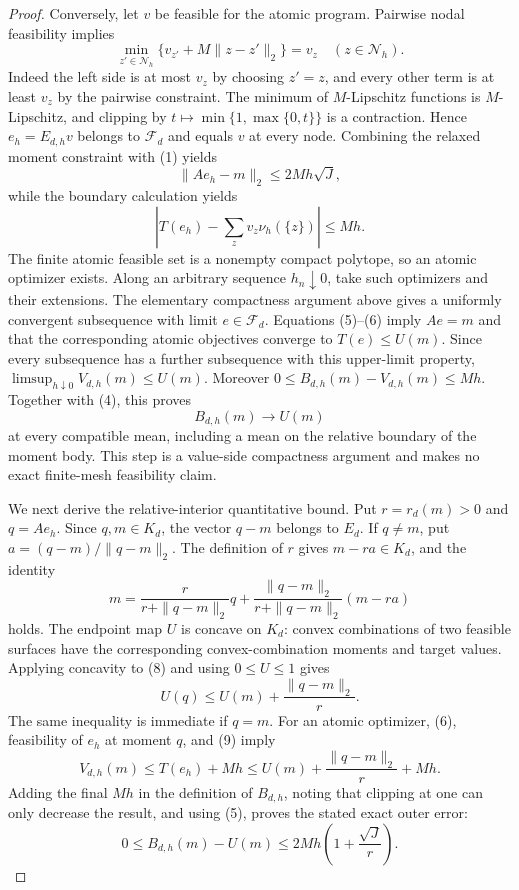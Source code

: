 \documentclass{article}
\begin{document}
\begin{proof}
Conversely, let \(v\) be feasible for the atomic program.  Pairwise nodal
feasibility implies
\[
 \min_{z'\in\mathcal N_h}\{v_{z'}+M\|z-z'\|_2\}=v_z
 \quad(z\in\mathcal N_h).
\]
Indeed the left side is at most \(v_z\) by choosing \(z'=z\), and every other
term is at least \(v_z\) by the pairwise constraint.  The minimum of
\(M\)-Lipschitz functions is \(M\)-Lipschitz, and clipping by
\(t\mapsto\min\{1,\max\{0,t\}\}\) is a contraction.  Hence
\(e_h=E_{d,h}v\) belongs to \(\mathcal F_d\) and equals \(v\) at every node.
Combining the relaxed moment constraint with (1) yields
\[
 \|Ae_h-m\|_2\le 2Mh\sqrt J,                                 \tag{5}
\]
while the boundary calculation yields
\[
 \left|T(e_h)-\sum_zv_z\nu_h(\{z\})\right|\le Mh.            \tag{6}
\]
The finite atomic feasible set is a nonempty compact polytope, so an atomic
optimizer exists.  Along an arbitrary sequence \(h_n\downarrow0\), take such
optimizers and their extensions.  The elementary compactness argument above
gives a uniformly convergent subsequence with limit \(e\in\mathcal F_d\).
Equations (5)--(6) imply \(Ae=m\) and that the corresponding atomic objectives
converge to \(T(e)\le U(m)\).  Since every subsequence has a further subsequence
with this upper-limit property,
\(\limsup_{h\downarrow0}V_{d,h}(m)\le U(m)\).  Moreover
\(0\le B_{d,h}(m)-V_{d,h}(m)\le Mh\).  Together with (4), this proves
\[
 B_{d,h}(m)\longrightarrow U(m)                              \tag{7}
\]
at every compatible mean, including a mean on the relative boundary of the
moment body.  This step is a value-side compactness argument and makes no exact
finite-mesh feasibility claim.

We next derive the relative-interior quantitative bound.  Put
\(r=r_d(m)>0\) and \(q=Ae_h\).  Since \(q,m\in K_d\), the vector
\(q-m\) belongs to \(E_d\).  If \(q\ne m\), put
\(a=(q-m)/\|q-m\|_2\).  The definition of \(r\) gives
\(m-ra\in K_d\), and the identity
\[
 m=\frac{r}{r+\|q-m\|_2}q
   +\frac{\|q-m\|_2}{r+\|q-m\|_2}(m-ra)                     \tag{8}
\]
holds.  The endpoint map \(U\) is concave on \(K_d\): convex combinations of
two feasible surfaces have the corresponding convex-combination moments and
target values.  Applying concavity to (8) and using \(0\le U\le1\) gives
\[
 U(q)\le U(m)+\frac{\|q-m\|_2}{r}.                           \tag{9}
\]
The same inequality is immediate if \(q=m\).  For an atomic optimizer,
(6), feasibility of \(e_h\) at moment \(q\), and (9) imply
\[
 V_{d,h}(m)\le T(e_h)+Mh
 \le U(m)+\frac{\|q-m\|_2}{r}+Mh.
\]
Adding the final \(Mh\) in the definition of \(B_{d,h}\), noting that clipping
at one can only decrease the result, and using (5), proves the stated exact
outer error:
\[
 0\le B_{d,h}(m)-U(m)
 \le 2Mh\left(1+\frac{\sqrt J}{r}\right).                   \tag{10}
\]


\end{proof}
\end{document}
